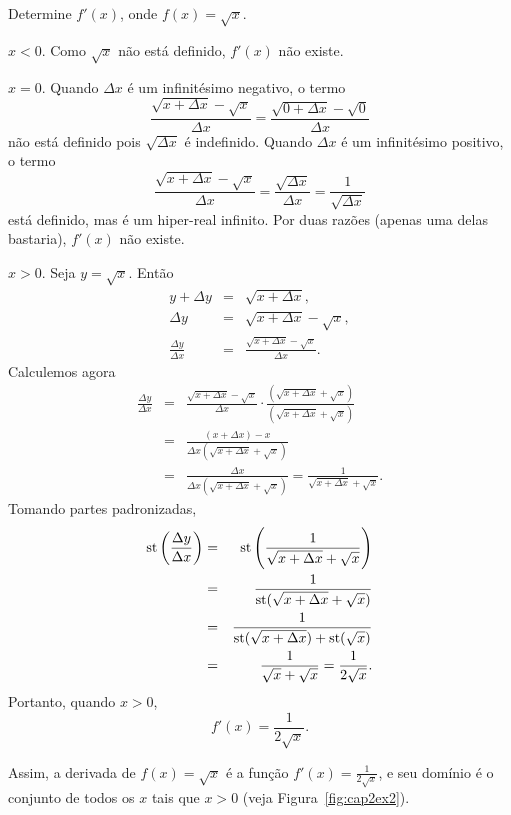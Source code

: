 \begin{example}
\label{ex:cap2ex2}
Determine $f'(x)$, onde $f(x) = \sqrt{x}$.
\begin{caseanalysis}
\item $x < 0$. Como $\sqrt{x}$ não está definido, $f'(x)$ não existe.
\item $x = 0$. Quando $\Delta{x}$ é um infinitésimo negativo, o termo
      $$
        \frac{\sqrt{x+\Delta{x}}-\sqrt{x}}{\Delta{x}} =
          \frac{\sqrt{0+\Delta{x}}-\sqrt{0}}{\Delta{x}}
      $$
      não está definido pois $\sqrt{\Delta{x}}$ é indefinido. Quando
      $\Delta{x}$ é um infinitésimo positivo, o termo
      $$
        \frac{\sqrt{x+\Delta{x}}-\sqrt{x}}{\Delta{x}} =
          \frac{\sqrt{\Delta{x}}}{\Delta{x}} =
            \frac{1}{\sqrt{\Delta{x}}}
      $$
      está definido, mas é um hiper-real infinito. Por duas razões
      (apenas uma delas bastaria), $f'(x)$ não existe.
\item $x>0$. Seja $y=\sqrt{x}$. Então
      \begin{eqnarray*}
        y+\Delta{y}                 & = & \sqrt{x + \Delta{x}}, \\
        \Delta{y}                   & = & \sqrt{x + \Delta{x}} - \sqrt{x}, \\
        \frac{\Delta{y}}{\Delta{x}} & = &
          \frac{\sqrt{x + \Delta{x}} - \sqrt{x}}{\Delta{x}}.
      \end{eqnarray*}
      Calculemos agora
      \begin{eqnarray*}
        \frac{\Delta{y}}{\Delta{x}} & = &
          \frac{\sqrt{x + \Delta{x}} - \sqrt{x}}{\Delta{x}} \cdot
          \frac{(\sqrt{x + \Delta{x}} + \sqrt{x})}
               {(\sqrt{x + \Delta{x}} + \sqrt{x})} \\
        & = &
          \frac{(x+\Delta{x})-x}{\Delta{x}(\sqrt{x + \Delta{x}} + \sqrt{x})} \\
        & = &
          \frac{\Delta{x}}{\Delta{x}(\sqrt{x + \Delta{x}} + \sqrt{x})} =
          \frac{1}{\sqrt{x + \Delta{x}} + \sqrt{x}}.
      \end{eqnarray*}
      Tomando partes padronizadas,
      \begin{eqnarray*}
        \operatorname{st}\left(\frac{\Delta{y}}{\Delta{x}}\right) & = &
          \operatorname{st}\left(\frac{1}{\sqrt{x + \Delta{x}} + \sqrt{x}}\right) \\
        & = &
          \frac{1}{\operatorname{st}(\sqrt{x + \Delta{x}} + \sqrt{x})} \\
        & = &
          \frac{1}{\operatorname{st}(\sqrt{x + \Delta{x}}) + \operatorname{st}(\sqrt{x})} \\
        & = &
          \frac{1}{\sqrt{x} + \sqrt{x}} = \frac{1}{2\sqrt{x}}.
      \end{eqnarray*}
      Portanto, quando $x > 0$,
      $$
        f'(x) = \frac{1}{2\sqrt{x}}.
      $$
\end{caseanalysis}
Assim, a derivada de $f(x) = \sqrt{x}$ é a função
$f'(x) = \frac{1}{2\sqrt{x}}$, e seu domínio é o conjunto de todos os
$x$ tais que $x > 0$ (veja Figura~\ref{fig:cap2ex2}).
\end{example}

